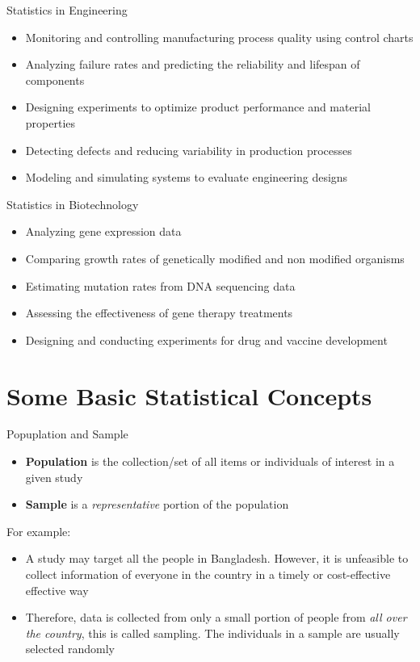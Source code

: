 \documentclass[12pt, aspectratio=169]{beamer}
\begin{document}
	\begin{frame}{Statistics in Engineering}
		\begin{itemize}
			\item Monitoring and controlling manufacturing process quality using control charts
			\item Analyzing failure rates and predicting the reliability and lifespan of components
			\item Designing experiments to optimize product performance and material properties
			\item Detecting defects and reducing variability in production processes
			\item Modeling and simulating systems to evaluate engineering designs
		\end{itemize}		
	\end{frame}


	\begin{frame}{Statistics in Biotechnology}
		\begin{itemize}
		\item Analyzing gene expression data
		\item Comparing growth rates of genetically modified and non modified organisms
		\item Estimating mutation rates from DNA sequencing data
		\item Assessing the effectiveness of gene therapy treatments
		\item Designing and conducting experiments for drug and vaccine development
	\end{itemize}
	\end{frame}


	\section{Some Basic Statistical Concepts}


	\begin{frame}{Popuplation and Sample}
		\begin{itemize}
			\item \textbf{Population} is the collection/set of all items or individuals of interest in a given study
			\item \textbf{Sample} is a \textit{representative} portion of the population
		\end{itemize}

		For example:
		\begin{itemize}
			\item A study may target all the people in Bangladesh. However, it is unfeasible to collect information of everyone in the country in a timely or cost-effective effective way
			\item Therefore, data is collected from only a small portion of people from \textit{all over the country}, this is called sampling. The individuals in a sample are usually selected randomly
		\end{itemize}
  	\end{frame}
\end{document}

